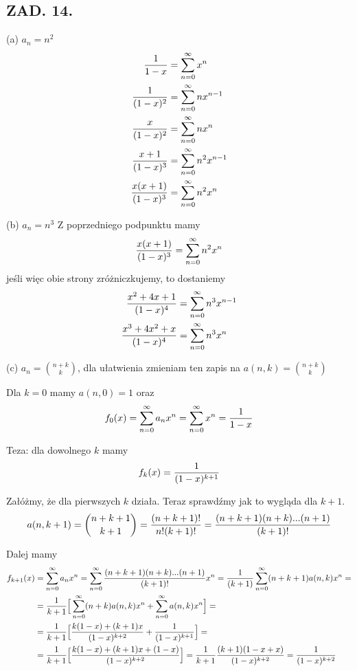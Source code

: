 \documentclass{article}[13pt]
\begin{document}

\subsection*{ZAD. 14.}

{\color{acc}(a)} $a_n=n^2$
\begin{align*}
    {1\over 1-x}&=\sum\limits_{n=0}^\infty x^n\\
    {1\over(1-x)^2}&=\sum\limits_{n=0}^\infty nx^{n-1}\\
    {x\over(1-x)^2}&=\sum\limits_{n=0}^\infty nx^n\\
    {x+1\over(1-x)^3}&=\sum\limits_{n=0}^\infty n^2x^{n-1}\\
    {x(x+1)\over(1-x)^3}&=\sum\limits_{n=0}^\infty n^2x^n
\end{align*}

{\color{acc}(b)} $a_n=n^3$
Z poprzedniego podpunktu mamy
$${x(x+1)\over(1-x)^3}=\sum\limits_{n=0}^\infty n^2x^n$$
jeśli więc obie strony zróżniczkujemy, to dostaniemy
\begin{align*}
    {x^2+4x+1\over(1-x)^4}&=\sum\limits_{n=0}^\infty n^3x^{n-1}\\
    {x^3+4x^2+x\over (1-x)^4}&=\sum\limits_{n=0}^\infty n^3x^n
\end{align*}

{\color{acc}(c)} $a_n={n+k\choose k}$, dla ułatwienia zmieniam ten zapis na $a(n,k)={n+k\choose k}$
\medskip

Dla $k=0$ mamy $a(n,0)=1$ oraz
$$f_0(x)=\sum\limits_{n=0}^\infty a_nx^n=\sum\limits_{n=0}^\infty x^n={1\over 1-x}$$

Teza: dla dowolnego $k$ mamy
$$f_k(x)={1\over(1-x)^{k+1}}$$

Załóżmy, że dla pierwszych $k$ działa. Teraz sprawdźmy jak to wygląda dla $k+1$. 
$$a(n, k+1)={n+k+1\choose k+1}={(n+k+1)!\over n!(k+1)!}={(n+k+1)(n+k)...(n+1)\over (k+1)!}$$

Dalej mamy
\begin{align*}
    f_{k+1}(x)&=\sum\limits_{n=0}^\infty a_nx^n=\sum\limits_{n=0}^\infty{(n+k+1)(n+k)...(n+1)\over (k+1)!}x^n={1\over(k+1)}\sum\limits_{n=0}^\infty(n+k+1)a(n, k)x^n=\\
    &=\frac1{k+1}\Big[\sum\limits_{n=0}^\infty(n+k)a(n, k)x^n+\sum\limits_{n=0}^\infty a(n, k)x^n\Big]=\\
    &={1\over k+1}\Big[{k(1-x)+(k+1)x\over(1-x)^{k+2}}+{1\over(1-x)^{k+1}}\Big]=\\
    &={1\over k+1}\Big[{k(1-x)+(k+1)x+(1-x)\over (1-x)^{k+2}}\Big]=\frac1{k+1}{(k+1)(1-x+x)\over(1-x)^{k+2}}={1\over(1-x)^{k+2}}
\end{align*}
\end{document}
